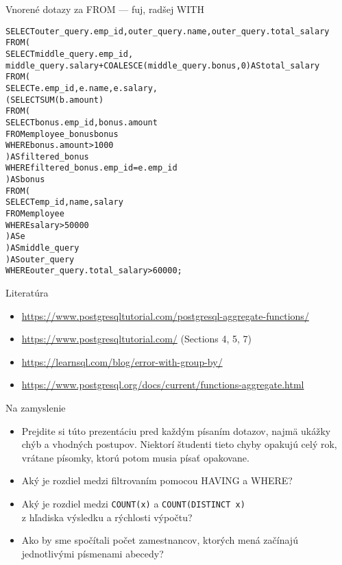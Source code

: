 \documentclass[12pt]{beamer}
\begin{document}
\begin{frame}[fragile]{Vnorené dotazy za FROM --- fuj, radšej WITH}
\scriptsize
\begin{alltt}
SELECT outer_query.emp_id, outer_query.name, outer_query.total_salary
FROM (
  SELECT middle_query.emp_id,
    middle_query.salary + COALESCE(middle_query.bonus, 0) AS total_salary
  FROM (
    SELECT e.emp_id, e.name, e.salary,
      (SELECT SUM(b.amount)
       FROM (
         SELECT bonus.emp_id, bonus.amount
         FROM employee_bonus bonus
         WHERE bonus.amount > 1000
       ) AS filtered_bonus
       WHERE filtered_bonus.emp_id = e.emp_id
      ) AS bonus
    FROM (
      SELECT emp_id, name, salary
      FROM employee
      WHERE salary > 50000
    ) AS e
  ) AS middle_query
) AS outer_query
WHERE outer_query.total_salary > 60000;
\end{alltt}
\end{frame}


\begin{frame}{Literatúra}
\begin{itemize}
\item {\scriptsize\url{https://www.postgresqltutorial.com/postgresql-aggregate-functions/}}
\item {\scriptsize\url{https://www.postgresqltutorial.com/} (Sections 4, 5, 7)}
\item {\scriptsize\url{https://learnsql.com/blog/error-with-group-by/}}
\item {\scriptsize\url{https://www.postgresql.org/docs/current/functions-aggregate.html}}
\end{itemize}
\end{frame}


\begin{frame}[fragile]{Na zamyslenie}
\begin{itemize}
\item Prejdite si túto prezentáciu pred každým písaním dotazov, najmä ukážky chýb a vhodných postupov.
    Niektorí študenti tieto chyby opakujú celý rok, vrátane písomky, ktorú potom musia písať opakovane.
\item Aký je rozdiel medzi filtrovaním pomocou HAVING a WHERE?
\item Aký je rozdiel medzi \verb|COUNT(x)| a \verb|COUNT(DISTINCT x)|\\
    z hľadiska výsledku a rýchlosti výpočtu?
\item Ako by sme spočítali počet zamestnancov, ktorých mená začínajú jednotlivými písmenami abecedy?
\end{itemize}
\end{frame}
\end{document}

